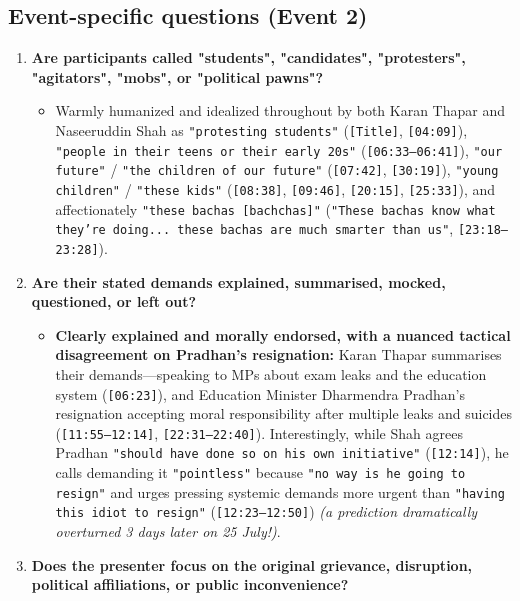 \documentclass[10pt,a4paper]{article}
\begin{document}
\subsection*{Event-specific questions (Event 2)}
\begin{enumerate}[leftmargin=1.6em, itemsep=4pt, topsep=4pt]
  \item \textbf{Are participants called "students", "candidates", "protesters", "agitators", "mobs", or "political pawns"?}
  \begin{itemize}[leftmargin=1.4em, itemsep=2pt, topsep=2pt]
    \item Warmly humanized and idealized throughout by both Karan Thapar and Naseeruddin Shah as \texttt{"protesting students"} (\texttt{[Title]}, \texttt{[04:09]}), \texttt{"people in their teens or their early 20s"} (\texttt{[06:33--06:41]}), \texttt{"our future"} / \texttt{"the children of our future"} (\texttt{[07:42]}, \texttt{[30:19]}), \texttt{"young children"} / \texttt{"these kids"} (\texttt{[08:38]}, \texttt{[09:46]}, \texttt{[20:15]}, \texttt{[25:33]}), and affectionately \texttt{"these bachas [bachchas]"} (\texttt{"These bachas know what they're doing... these bachas are much smarter than us"}, \texttt{[23:18--23:28]}).
  \end{itemize}
  \item \textbf{Are their stated demands explained, summarised, mocked, questioned, or left out?}
  \begin{itemize}[leftmargin=1.4em, itemsep=2pt, topsep=2pt]
    \item \textbf{Clearly explained and morally endorsed, with a nuanced tactical disagreement on Pradhan's resignation:} Karan Thapar summarises their demands---speaking to MPs about exam leaks and the education system (\texttt{[06:23]}), and Education Minister Dharmendra Pradhan's resignation accepting moral responsibility after multiple leaks and suicides (\texttt{[11:55--12:14]}, \texttt{[22:31--22:40]}). Interestingly, while Shah agrees Pradhan \texttt{"should have done so on his own initiative"} (\texttt{[12:14]}), he calls demanding it \texttt{"pointless"} because \texttt{"no way is he going to resign"} and urges pressing systemic demands more urgent than \texttt{"having this idiot to resign"} (\texttt{[12:23--12:50]}) \textit{(a prediction dramatically overturned 3 days later on 25 July!)}.
  \end{itemize}
  \item \textbf{Does the presenter focus on the original grievance, disruption, political affiliations, or public inconvenience?}

\end{enumerate}
\end{document}
